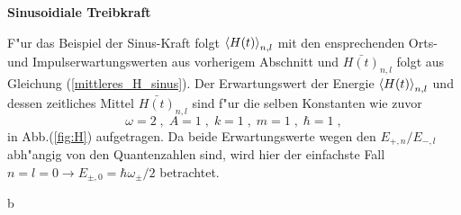     \textbf{Sinusoidiale Treibkraft}

    F"ur das Beispiel der Sinus-Kraft folgt $\braket{H(t)}_{n,l}$ mit den ensprechenden Orts- und Impulserwartungswerten aus vorherigem Abschnitt und  $\bar{H(t)}_{n,l}$ folgt aus Gleichung (\ref{mittleres_H_sinus}).
    Der Erwartungswert der Energie $\braket{H(t)}_{n,l}$ und dessen zeitliches Mittel $\bar{H(t)}_{n,l}$ sind f"ur die selben Konstanten wie zuvor
    \begin{equation}
      \omega=2 \;,\; A=1 \;,\; k=1 \;,\; m=1 \;,\; \hbar=1 \; ,
    \end{equation}
    in Abb.(\ref{fig:H}) aufgetragen.
    Da beide Erwartungswerte wegen den $E_{+,n}/E_{-,l}$ abh"angig von den Quantenzahlen sind, wird hier der einfachste Fall $n=l=0 \rightarrow E_{\pm,0}=\hbar \omega_\pm/2$ betrachtet.
























































b
